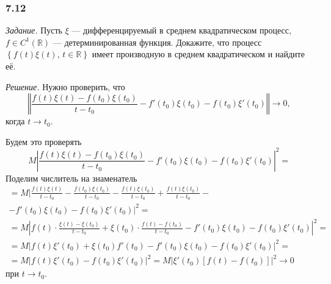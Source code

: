 \subsubsection*{7.12}

\textit{Задание.}
Пусть $ \xi $ --- дифференцируемый в среднем квадратическом процесс,
$f \in C^1 \left( \mathbb{R} \right) $ --- детерминированная функция.
Докажите,
что процесс $ \left\{ f \left( t \right) \xi \left( t \right), \, t \in \mathbb{R} \right\} $
имеет производную в среднем квадратическом и найдите её.

\textit{Решение.}
Нужно проверить, что
$$ \left \Vert
    \frac{f \left( t \right) \xi \left( t \right) - f \left( t_0 \right) \xi \left( t_0 \right) }{t - t_0} -
    f' \left( t_0 \right) \xi \left( t_0 \right) - f \left( t_0 \right) \xi' \left( t_0 \right)
  \right \Vert \to
  0,$$
когда $t \to t_0$.

Будем это проверять
$$M \left|
    \frac{f \left( t \right) \xi \left( t \right) - f \left( t_0 \right) \xi \left( t_0 \right) }{t - t_0} -
    f' \left( t_0 \right) \xi \left( t_0 \right) - f \left( t_0 \right) \xi' \left( t_0 \right)
  \right|^2 =$$
Поделим числитель на знаменатель
\begin{gather*}
  = M|
    \frac{f \left( t \right) \xi \left( t \right) }{t - t_0} -
    \frac{f \left( t_0 \right) \xi \left( t_0 \right) }{t - t_0} -
    \frac{f \left( t \right) \xi \left( t_0 \right) }{t - t_0} +
    \frac{f \left( t \right) \xi \left( t_0 \right) }{t - t_0} - \\
    - f' \left( t_0 \right) \xi \left( t_0 \right) - f \left( t_0 \right) \xi' \left( t_0 \right)
  |^2 = \\
  = M \left|
    f \left( t \right) \cdot \frac{ \xi \left( t \right) - \xi \left( t_0 \right) }{t - t_0} +
    \xi \left( t_0 \right) \cdot \frac{f \left( t \right) - f \left( t_0 \right) }{t - t_0} -
    f' \left( t_0 \right) \xi \left( t_0 \right) - f \left( t_0 \right) \xi' \left( t_0 \right)
  \right|^2 = \\
  = M \left|
    f \left( t \right) \xi' \left( t_0 \right) + \xi \left( t_0 \right) f' \left( t_0 \right) -
    f' \left( t_0 \right) \xi \left( t_0 \right) - f \left( t_0 \right) \xi' \left( t_0 \right)
  \right|^2 = \\
  = M \left|
    f \left( t \right) \xi' \left( t_0 \right) - f \left( t_0 \right) \xi' \left( t_0 \right)
  \right|^2 =
  M \left|
    \xi' \left( t_0 \right) \left[ f \left( t \right) - f \left( t_0 \right) \right]
  \right|^2 \to
  0
\end{gather*}
при $t \to t_0$.

